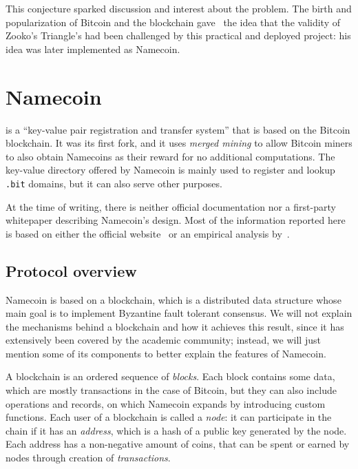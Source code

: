 \documentclass[mscthesis]{usiinfthesis}
\begin{document}
This conjecture sparked discussion and interest about the problem. The birth and popularization of Bitcoin and the blockchain gave~\cite{swartz2011names} the idea that the validity of Zooko's Triangle's had been challenged by this practical and deployed project: his idea was later implemented as Namecoin.

\section{Namecoin}\label{proj:namecoin}

\cite{namecoin} is a ``key-value pair registration and transfer system'' %
that is based on the Bitcoin blockchain. It was its first fork, %
and it uses \textit{merged mining} to allow Bitcoin miners to also obtain Namecoins as their reward for no additional computations. %
The key-value directory offered by Namecoin is mainly used to register and lookup \texttt{.bit} domains, but it can also serve other purposes. %

At the time of writing, there is neither official documentation nor a first-party whitepaper describing Namecoin's design. Most of the information reported here is based on either the official website~\cite{} or an empirical analysis by~\cite{kalodner2015empirical}.

\subsection{Protocol overview}\label{sec:namecoindesc}
Namecoin is based on a blockchain, which is a distributed data structure whose main goal is to implement Byzantine fault tolerant consensus. We will not explain the mechanisms behind a blockchain and how it achieves this result, since it has extensively been covered by the academic community; %
instead, we will just mention some of its components to better explain the features of Namecoin.

A blockchain is an ordered sequence of \emph{blocks}. Each block contains some data, which are mostly transactions in the case of Bitcoin, but they can also include operations and records, on which Namecoin expands by introducing custom functions.
Each user of a blockchain is called a \emph{node}: it can participate in the chain if it has an \emph{address}, which is a hash of a public key generated by the node. Each address has a non-negative amount of coins, that can be spent or earned by nodes through creation of \emph{transactions}.
\end{document}
